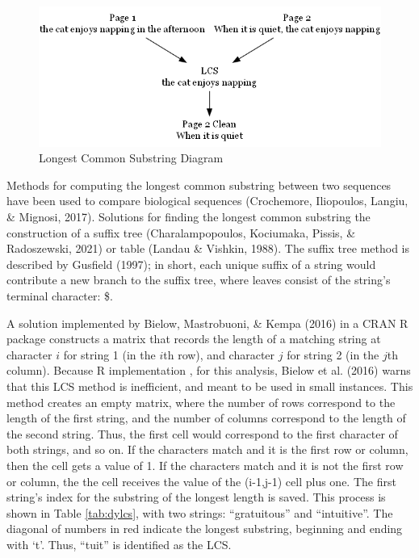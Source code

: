 \documentclass[print]{nuthesis}
\begin{document}
\begin{figure}

{\centering \includegraphics[width=\linewidth]{images/svg_graph} 

}

\caption{Longest Common Substring Diagram}\label{fig:lcs}
\end{figure}

Methods for computing the longest common substring between two sequences have been used to compare biological sequences (Crochemore, Iliopoulos, Langiu, \& Mignosi, 2017).
Solutions for finding the longest common substring  the construction of a suffix tree (Charalampopoulos, Kociumaka, Pissis, \& Radoszewski, 2021) or table (Landau \& Vishkin, 1988).
The suffix tree method is described by Gusfield (1997); in short, each unique suffix of a string would contribute a new branch to the suffix tree, where leaves consist of the string's terminal character: \$.

A solution implemented by Bielow, Mastrobuoni, \& Kempa (2016) in a CRAN R package constructs a matrix that records the length of a matching string at character \(i\) for string 1 (in the \(i\)th row), and character \(j\) for string 2 (in the \(j\)th column).
Because  R implementation ,  for this analysis,
 Bielow et al. (2016) warns that this LCS method is inefficient, and meant to be used in small instances.
This method creates an empty matrix, where the number of rows correspond to the length of the first string, and the number of columns correspond to the length of the second string.
Thus, the first cell would correspond to the first character of both strings, and so on.
If the characters match and it is the first row or column, then the cell gets a value of 1.
If the characters match and it is not the first row or column, the the cell receives the value of the (i-1,j-1) cell plus one.
The first string's index for the substring of the longest length is saved.
This process is shown in Table \ref{tab:dylcs}, with two strings: ``gratuitous'' and ``intuitive''.
The diagonal of numbers in red indicate the longest substring, beginning and ending with `t'.
Thus, ``tuit'' is identified as the LCS.
\end{document}

